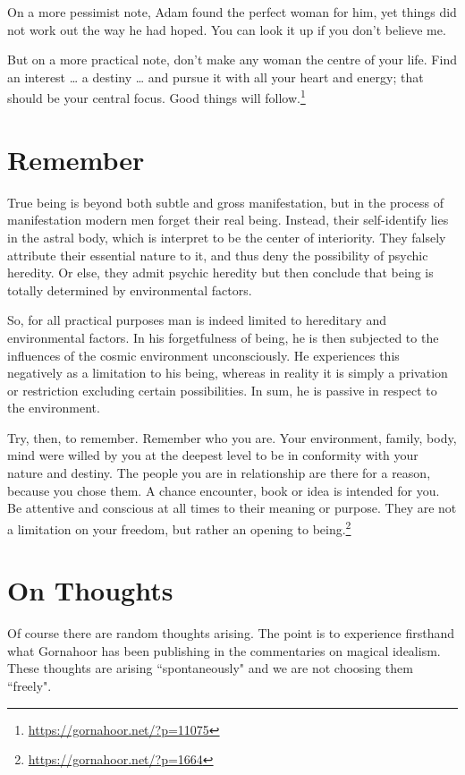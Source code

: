 On a more pessimist note, Adam found the perfect woman for him, yet things did not work out the way he had hoped. You can look it up if you don’t believe me.

But on a more practical note, don’t make any woman the centre of your life. Find an interest … a destiny … and pursue it with all your heart and energy; that should be your central focus. Good things will follow.\footnote{\url{https://gornahoor.net/?p=11075}}

\section{Remember}

True being is beyond both subtle and gross manifestation, but in the process of manifestation modern men forget their real being. Instead, their self-identify lies in the astral body, which is interpret to be the center of interiority. They falsely attribute their essential nature to it, and thus deny the possibility of psychic heredity. Or else, they admit psychic heredity but then conclude that being is totally determined by environmental factors.

So, for all practical purposes man is indeed limited to hereditary and environmental factors. In his forgetfulness of being, he is then subjected to the influences of the cosmic environment unconsciously. He experiences this negatively as a limitation to his being, whereas in reality it is simply a privation or restriction excluding certain possibilities. In sum, he is passive in respect to the environment.

Try, then, to remember. Remember who you are. Your environment, family, body, mind were willed by you at the deepest level to be in conformity with your nature and destiny. The people you are in relationship are there for a reason, because you chose them. A chance encounter, book or idea is intended for you. Be attentive and conscious at all times to their meaning or purpose. They are not a limitation on your freedom, but rather an opening to being.\footnote{\url{https://gornahoor.net/?p=1664}}

\section{On Thoughts}

Of course there are random thoughts arising. The point is to experience firsthand what Gornahoor has been publishing in the commentaries on magical idealism. These thoughts are arising ``spontaneously" and we are not choosing them ``freely".

